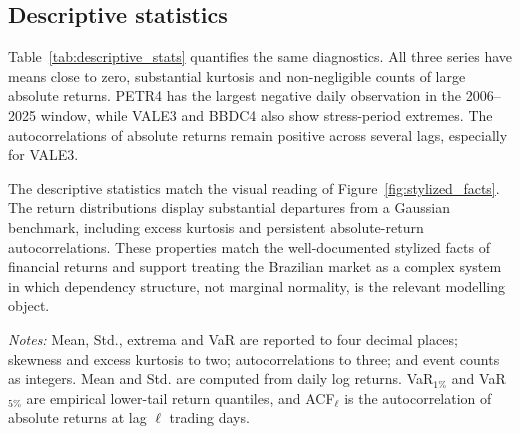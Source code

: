 \subsection{Descriptive statistics}

Table~\ref{tab:descriptive_stats} quantifies the same diagnostics. All three series have means close to zero, substantial kurtosis and non-negligible counts of large absolute returns. PETR4 has the largest negative daily observation in the 2006--2025 window, while VALE3 and BBDC4 also show stress-period extremes. The autocorrelations of absolute returns remain positive across several lags, especially for VALE3.

The descriptive statistics match the visual reading of Figure~\ref{fig:stylized_facts}. The return distributions display substantial departures from a Gaussian benchmark, including excess kurtosis and persistent absolute-return autocorrelations. These properties match the well-documented stylized facts of financial returns \cite{cont_2001_empirical} and support treating the Brazilian market as a complex system in which dependency structure, not marginal normality, is the relevant modelling object.

\begin{center}
\label{tab:descriptive_stats}
\scriptsize
\setlength{\tabcolsep}{2.8pt}
\end{center}

\noindent\footnotesize\emph{Notes:} Mean, Std., extrema and VaR are reported to four decimal places; skewness and excess kurtosis to two; autocorrelations to three; and event counts as integers. Mean and Std. are computed from daily log returns. VaR$_{1\%}$ and VaR$_{5\%}$ are empirical lower-tail return quantiles, and ACF$_\ell$ is the autocorrelation of absolute returns at lag $\ell$ trading days.\GlobalPrecisionNote

